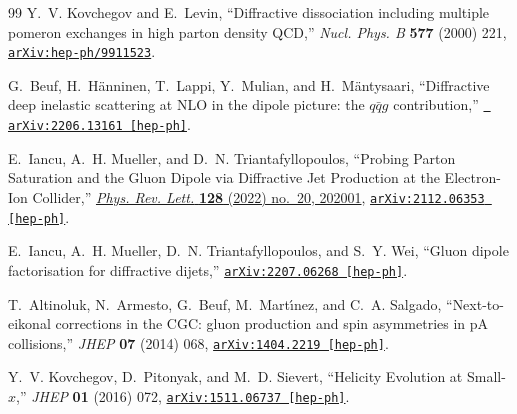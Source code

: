 \begin{thebibliography}{99}
Y.~V. Kovchegov and E.~Levin, ``{Diffractive dissociation including multiple pomeron exchanges in high parton density QCD},'' {\em Nucl. Phys. B} {\bf 577} (2000) 221, \href{http://arxiv.org/abs/hep-ph/9911523}{{\tt arXiv:hep-ph/9911523}}.

G.~Beuf, H.~H\"anninen, T.~Lappi, Y.~Mulian, and H.~M\"antysaari,
  ``{Diffractive deep inelastic scattering at NLO in the dipole picture: the $q
  \bar q g$ contribution},'' \href{http://arxiv.org/abs/2206.13161}{{\tt
  arXiv:2206.13161 [hep-ph]}}.

E.~Iancu, A.~H. Mueller, and D.~N. Triantafyllopoulos, ``{Probing Parton
  Saturation and the Gluon Dipole via Diffractive Jet Production at the
  Electron-Ion Collider},''
  \href{http://dx.doi.org/10.1103/PhysRevLett.128.202001}{{\em Phys. Rev.
  Lett.} {\bf 128} (2022) no.~20, 202001},
  \href{http://arxiv.org/abs/2112.06353}{{\tt arXiv:2112.06353 [hep-ph]}}.

E.~Iancu, A.~H. Mueller, D.~N. Triantafyllopoulos, and S.~Y. Wei, ``{Gluon
  dipole factorisation for diffractive dijets},''
  \href{http://arxiv.org/abs/2207.06268}{{\tt arXiv:2207.06268 [hep-ph]}}.

T.~Altinoluk, N.~Armesto, G.~Beuf, M.~Mart\'{\i}nez, and C.~A. Salgado, ``{Next-to-eikonal corrections in the CGC: gluon production and spin asymmetries in pA collisions},'' {\em JHEP} {\bf 07} (2014) 068, \href{http://arxiv.org/abs/1404.2219}{{\tt arXiv:1404.2219 [hep-ph]}}.

Y.~V. Kovchegov, D.~Pitonyak, and M.~D. Sievert, ``{Helicity Evolution at Small-$x$},'' {\em JHEP} {\bf 01} (2016) 072, \href{http://arxiv.org/abs/1511.06737}{{\tt arXiv:1511.06737 [hep-ph]}}.

\end{thebibliography}\endgroup
